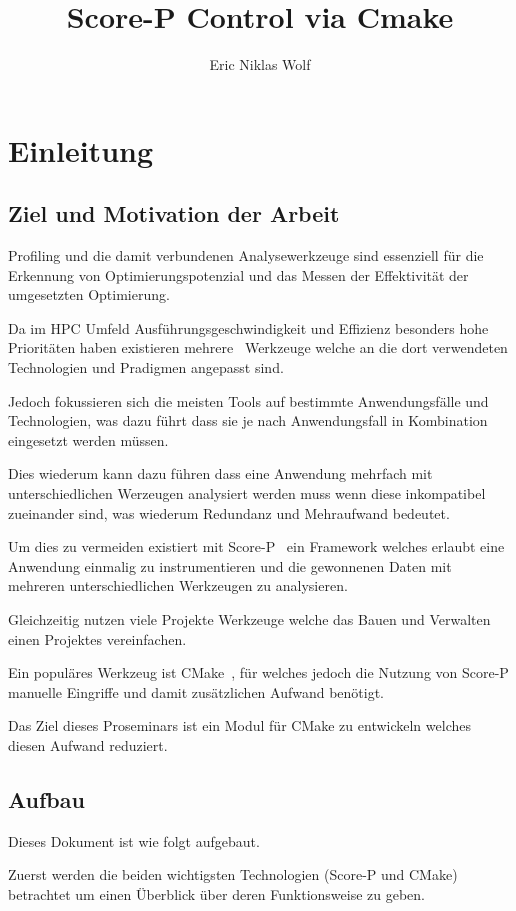 \documentclass[german,proseminar,hyperref,utf8,lof]{zihpub}
\author{Eric Niklas Wolf}
\title{Score-P Control via Cmake}
\begin{document}
    \section{Einleitung}
    \subsection{Ziel und Motivation der Arbeit}
    Profiling und die damit verbundenen Analysewerkzeuge sind essenziell für die Erkennung von
    Optimierungspotenzial und das Messen der Effektivität der umgesetzten Optimierung.

    Da im HPC Umfeld Ausführungsgeschwindigkeit und Effizienz besonders hohe Prioritäten haben existieren
    mehrere~ Werkzeuge welche an die dort verwendeten Technologien
    und Pradigmen angepasst sind.

    Jedoch fokussieren sich die meisten Tools auf bestimmte Anwendungsfälle und Technologien,
    was dazu führt dass sie je nach Anwendungsfall in Kombination eingesetzt werden müssen.

    Dies wiederum kann dazu führen dass eine Anwendung mehrfach mit unterschiedlichen Werzeugen
    analysiert werden muss wenn diese inkompatibel zueinander sind, was wiederum Redundanz
    und Mehraufwand bedeutet.

    Um dies zu vermeiden existiert mit Score-P~\cite{Score-P-Paper} ein Framework welches erlaubt
    eine Anwendung  einmalig zu instrumentieren und die gewonnenen Daten mit mehreren
    unterschiedlichen Werkzeugen zu analysieren.

    Gleichzeitig nutzen viele Projekte Werkzeuge welche das Bauen und Verwalten einen Projektes
    vereinfachen.

    Ein populäres Werkzeug ist CMake~\cite{CMake-Documentation}, für welches jedoch die Nutzung
    von Score-P manuelle Eingriffe und damit zusätzlichen Aufwand benötigt.

    Das Ziel dieses Proseminars ist ein Modul für CMake zu entwickeln welches diesen Aufwand
    reduziert.


    \subsection{Aufbau}
    Dieses Dokument ist wie folgt aufgebaut.

    Zuerst werden die beiden wichtigsten Technologien (Score-P und CMake) betrachtet um einen
    Überblick über deren Funktionsweise zu geben.
\end{document}
